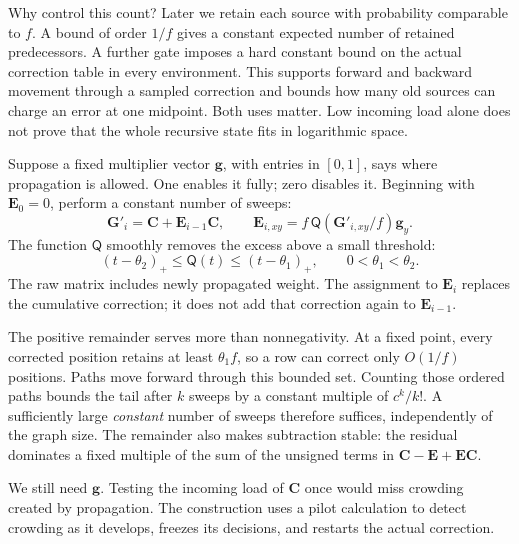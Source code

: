 \documentclass[11pt]{article}
\numberwithin{equation}{section}
\theoremstyle{definition}
\theoremstyle{remark}
\begin{document}
Why control this count? Later we retain each source with probability comparable to \(f\). A bound of order \(1/f\) gives a constant expected number of retained predecessors. A further gate imposes a hard constant bound on the actual correction table in every environment. This supports forward and backward movement through a sampled correction and bounds how many old sources can charge an error at one midpoint. Both uses matter. Low incoming load alone does not prove that the whole recursive state fits in logarithmic space.

Suppose a fixed multiplier vector \(\mathbf g\), with entries in \([0,1]\), says where propagation is allowed. One enables it fully; zero disables it. Beginning with \(\mathbf E_0=0\), perform a constant number of sweeps:
\begin{equation}
 \mathbf G'_i=\mathbf C+\mathbf E_{i-1}\mathbf C,\qquad
 \mathbf E_{i,xy}
   =f\,\mathsf Q(\mathbf G'_{i,xy}/f)\mathbf g_y.
 \label{eq:overview-sweeps}
\end{equation}
The function \(\mathsf Q\) smoothly removes the excess above a small threshold:
\[
 (t-\theta_2)_+\leq\mathsf Q(t)\leq(t-\theta_1)_+,
 \qquad 0<\theta_1<\theta_2.
\]
The raw matrix includes newly propagated weight. The assignment to \(\mathbf E_i\) replaces the cumulative correction; it does not add that correction again to \(\mathbf E_{i-1}\).

The positive remainder serves more than nonnegativity. At a fixed point, every corrected position retains at least \(\theta_1 f\), so a row can correct only \(O(1/f)\) positions. Paths move forward through this bounded set. Counting those ordered paths bounds the tail after \(k\) sweeps by a constant multiple of \(c^k/k!\). A sufficiently large \emph{constant} number of sweeps therefore suffices, independently of the graph size. The remainder also makes subtraction stable: the residual dominates a fixed multiple of the sum of the unsigned terms in \(\mathbf C-\mathbf E+\mathbf E\mathbf C\).

We still need \(\mathbf g\). Testing the incoming load of \(\mathbf C\) once would miss crowding created by propagation. The construction uses a pilot calculation to detect crowding as it develops, freezes its decisions, and restarts the actual correction.
\end{document}
